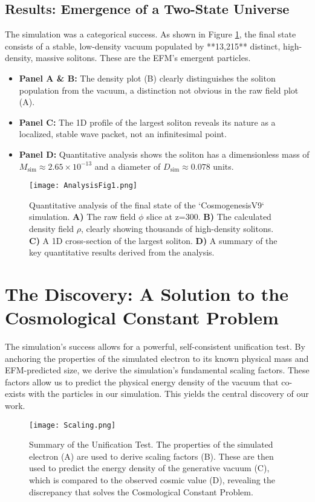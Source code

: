 \documentclass[11pt, twoside]{article}
\begin{document}
\subsection{Results: Emergence of a Two-State Universe}
The simulation was a categorical success. As shown in Figure \ref{fig:analysis}, the final state consists of a stable, low-density vacuum populated by **13,215** distinct, high-density, massive solitons. These are the EFM's emergent particles.
\begin{itemize}
    \item \textbf{Panel A \& B:} The density plot (B) clearly distinguishes the soliton population from the vacuum, a distinction not obvious in the raw field plot (A).
    \item \textbf{Panel C:} The 1D profile of the largest soliton reveals its nature as a localized, stable wave packet, not an infinitesimal point.
    \item \textbf{Panel D:} Quantitative analysis shows the soliton has a dimensionless mass of \(M_{\text{sim}} \approx 2.65 \times 10^{-13}\) and a diameter of \(D_{\text{sim}} \approx 0.078\) units.
\end{itemize}

\begin{figure}[t]
    \centering
    \texttt{[image: AnalysisFig1.png]}
    \caption{Quantitative analysis of the final state of the `CosmogenesisV9` simulation. \textbf{A)} The raw field \(\phi\) slice at z=300. \textbf{B)} The calculated density field \(\rho\), clearly showing thousands of high-density solitons. \textbf{C)} A 1D cross-section of the largest soliton. \textbf{D)} A summary of the key quantitative results derived from the analysis.}
    \label{fig:analysis}
\end{figure}

\section{The Discovery: A Solution to the Cosmological Constant Problem}
The simulation's success allows for a powerful, self-consistent unification test. By anchoring the properties of the simulated electron to its known physical mass and EFM-predicted size, we derive the simulation's fundamental scaling factors. These factors allow us to predict the physical energy density of the vacuum that co-exists with the particles in our simulation. This yields the central discovery of our work.

\begin{figure}[h!]
    \centering
    \texttt{[image: Scaling.png]}
    \caption{Summary of the Unification Test. The properties of the simulated electron (A) are used to derive scaling factors (B). These are then used to predict the energy density of the generative vacuum (C), which is compared to the observed cosmic value (D), revealing the discrepancy that solves the Cosmological Constant Problem.}
    \label{fig:scaling}
\end{figure}
\end{document}
